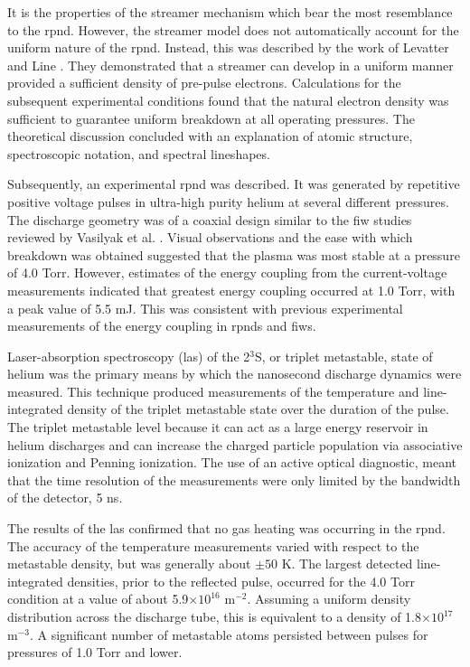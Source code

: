 It is the properties of the streamer mechanism which bear the most resemblance
to the \acs{rpnd}. However, the streamer model does not automatically account
for the uniform nature of the \acs{rpnd}. Instead, this was described by the
work of Levatter and Line \cite{Levatter1980}. They demonstrated that a streamer
can develop in a uniform manner provided a sufficient density of pre-pulse
electrons. Calculations for the subsequent experimental conditions found that
the natural electron density was sufficient to guarantee uniform breakdown at
all operating pressures. The theoretical discussion concluded with an
explanation of atomic structure, spectroscopic notation, and spectral
lineshapes.

Subsequently, an experimental \acs{rpnd} was described. It was generated by
repetitive positive voltage pulses in ultra-high purity helium at several
different pressures. The discharge geometry was of a coaxial design similar to
the \acs{fiw} studies reviewed by Vasilyak et al. \cite{Vasilyak1994}. Visual
observations and the ease with which breakdown was obtained suggested that the
plasma was most stable at a pressure of 4.0 Torr. However, estimates of the
energy coupling from the current-voltage measurements indicated that greatest
energy coupling occurred at 1.0 Torr, with a peak value of 5.5 mJ. This was
consistent with previous experimental measurements of the energy coupling in
\acs{rpnd}s and \acs{fiw}s.

Laser-absorption spectroscopy (\acs{las}) of the 2$^3$S, or triplet metastable,
state of helium was the primary means by which the nanosecond discharge dynamics
were measured. This technique produced measurements of the temperature and
line-integrated density of the triplet metastable state over the duration of the
pulse. The triplet metastable level because it can act as a large energy
reservoir in helium discharges and can increase the charged particle population
via associative ionization and Penning ionization. The use of an active optical
diagnostic, meant that the time resolution of the measurements were only limited
by the bandwidth of the detector, 5 ns.

The results of the \acs{las} confirmed that no gas heating was occurring in the
\acs{rpnd}. The accuracy of the temperature measurements varied with respect to
the metastable density, but was generally about $\pm50$ K. The largest detected
line-integrated densities, prior to the reflected pulse, occurred for the 4.0
Torr condition at a value of about 5.9$\times10^{16}$ m$^{-2}$. Assuming a
uniform density distribution across the discharge tube, this is equivalent to a
density of 1.8$\times10^{17}$ m$^{-3}$. A significant number of metastable atoms
persisted between pulses for pressures of 1.0 Torr and lower.

